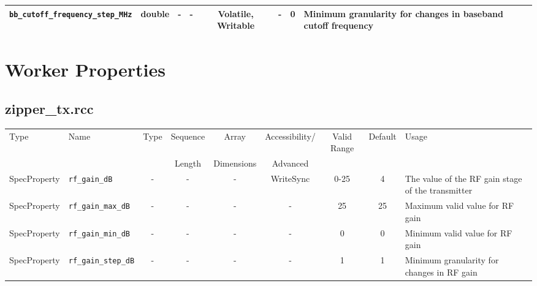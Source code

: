 \documentclass{article}
\def\comp{zipper\_tx}
\begin{document}
\begin{landscape}
\begin{scriptsize}
\begin{tabular}{|p{4cm}|c|c|c|c|c|c|p{8cm}|}
			\hline
			\verb+bb_cutoff_frequency_step_MHz+ & double & -        & -          & Volatile, Writable & -           & 0       & Minimum granularity for changes in baseband cutoff frequency                                                                                \\
			\hline
		\end{tabular}
	\end{scriptsize}

	\section*{Worker Properties}
	\subsection*{\comp.rcc}
	\begin{scriptsize}
		\begin{tabular}{|p{2cm}|p{4cm}|c|c|c|c|c|c|p{6.5cm}|}
			\hline
			\rowcolor{blue}
			Type         & Name                                & Type & Sequence & Array      & Accessibility/ & Valid Range  & Default & Usage                                                                                         \\
			\rowcolor{blue}
			             &                                     &      & Length   & Dimensions & Advanced       &              &         &                                                                                               \\
			\hline
			SpecProperty & \verb+rf_gain_dB+                   & -    & -        & -          & WriteSync      & 0-25         & 4       & The value of the RF gain stage of the transmitter                                             \\
			\hline
			SpecProperty & \verb+rf_gain_max_dB+               & -    & -        & -          & -              & 25           & 25      & Maximum valid value for RF gain                                                               \\
			\hline
			SpecProperty & \verb+rf_gain_min_dB+               & -    & -        & -          & -              & 0            & 0       & Minimum valid value for RF gain                                                               \\
			\hline
			SpecProperty & \verb+rf_gain_step_dB+              & -    & -        & -          & -              & 1            & 1       & Minimum granularity for changes in RF gain                                                    \\

\end{tabular}
\end{scriptsize}
\end{landscape}
\end{document}
